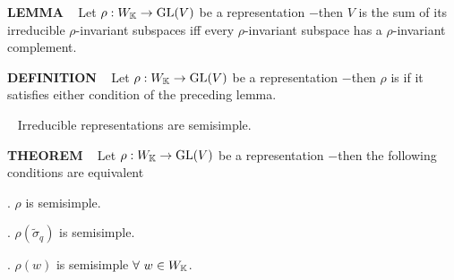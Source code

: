 \vspace{0.1cm}

\begin{x}{\small\bf LEMMA} \ %
Let $\rho:W_{\mathbb{K}} \rightarrow \text{GL}(V)$ be a representation $-$then $V$ is the sum of its irreducible $\rho$-invariant subspaces iff 
every $\rho$-invariant subspace has a $\rho$-invariant complement.
\end{x}

\vspace{0.1cm}

\begin{x}{\small\bf DEFINITION} \ %
Let $\rho:W_{\mathbb{K}} \rightarrow \text{GL}(V)$ be a representation $-$then $\rho$ is  if it satisfies either condition of the preceding lemma.
\end{x}

\vspace{0.1cm}

\begin{x}{\small\bf {}} \ %
Irreducible representations are semisimple.
\end{x}

\vspace{0.1cm}

\begin{x}{\small\bf THEOREM} \ %
Let $\rho:W_{\mathbb{K}} \rightarrow \text{GL}(V)$ be a representation $-$then the following conditions are equivalent

. \quad $\rho$ is semisimple.

. \quad $\rho(\widetilde{\sigma}_q)$ is semisimple.

. \quad $\rho(w)$ is semisimple $\forall \ w \in W_{\mathbb{K}}$.
\end{x}

\vspace{0.1cm}






















